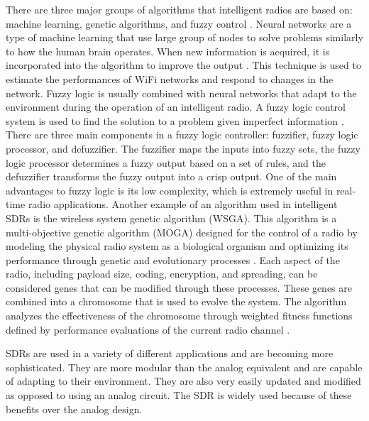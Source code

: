 There are three major groups of algorithms that intelligent radios are based on: machine learning, genetic algorithms, and fuzzy control \cite{amraoui2012intelligent}. Neural networks are a type of machine learning that use large group of nodes to solve problems similarly to how the human brain operates. When new information is acquired, it is incorporated into the algorithm to improve the output \cite{amini2011universal}. This technique is used to estimate the performances of WiFi networks and respond to changes in the network. Fuzzy logic is usually combined with neural networks that adapt to the environment during the operation of an intelligent radio. A fuzzy logic control system is used to find the solution to a problem given imperfect information \cite{amraoui2012intelligent}. There are three main components in a fuzzy logic controller: fuzzifier, fuzzy logic processor, and defuzzifier. The fuzzifier maps the inputs into fuzzy sets, the fuzzy logic processor determines a fuzzy output based on a set of rules, and the defuzzifier transforms the fuzzy output into a crisp output. One of the main advantages to fuzzy logic is its low complexity, which is extremely useful in real-time radio applications. Another example of an algorithm used in intelligent SDRs is the wireless system genetic algorithm (WSGA). This algorithm is a multi-objective genetic algorithm (MOGA) designed for the control of a radio by modeling the physical radio system as a biological organism and optimizing its performance through genetic and evolutionary processes \cite{rondeau2004cognitive}. Each aspect of the radio, including payload size, coding, encryption, and spreading, can be considered genes that can be modified through these processes. These genes are combined into a chromosome that is used to evolve the system. The algorithm analyzes the effectiveness of the chromosome through weighted fitness functions defined by performance evaluations of the current radio channel \cite{rondeau2004cognitive}.\par
SDRs are used in a variety of different applications and are becoming more sophisticated. They are more modular than the analog equivalent and are capable of adapting to their environment. They are also very easily updated and modified as opposed to using an analog circuit. The SDR is widely used because of these benefits over the analog design. \par

